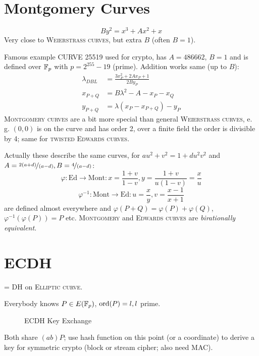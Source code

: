 \section{Montgomery Curves}

\[
By^2 = x^3 + Ax^2 + x
\]
Very close to \textsc{Weierstrass curves}, but extra $B$ (often $B = 1$).

Famous example \textsc{CURVE 25519} used for crypto, has $A=486662$, $B=1$ and is defined over $\mathbb{F}_p$ with $p=2^{255} - 19$ (prime). Addition works same (up to $B$):
\begin{align*}
\lambda_{DBL} &= \frac{3x_P^2 + 2 A x_P + 1}{2 B y_P} \\
x_{P+Q} &= B \lambda^2 - A -x_P - x_Q\\
y_{P+Q} &= \lambda(x_P - x_{P+Q}) - y_P
\end{align*}
\textsc{Montgomery curves} are a bit more special than general \textsc{Weierstrass curves}, e.\,g. $(0,0)$ is on the curve and has order 2, over  a finite field the order is divisible by 4; same for \textsc{twisted Edwards curves}.

Actually these describe the same curves, for $a u^2 +v^2 = 1 +d u^2 v^2$ and $A=\nicefrac{2(a+d)}{(a-d)}, B= \nicefrac{4}{(a-d)}$:
\[
\varphi: \text{Ed} \rightarrow \text{Mont}: x= \frac{1+v}{1-v}, y= \frac{1+v}{u(1-v)} = \frac{x}{u}
\]
\[
\varphi^{-1}: \text{Mont} \rightarrow \text{Ed}: u= \frac{x}{y}, v= \frac{x-1}{x+1}
\]
are defined almost everywhere and $\varphi(P+Q) = \varphi(P) + \varphi(Q)$, $\varphi^{-1} \left(\varphi(P)\right) = P$ etc. \textsc{Montgomery} and \textsc{Edwards curves} are \emph{birationally equivalent}.

\section{ECDH}

= \textsc{DH} on \textsc{Elliptic curve}.

Everybody knows $P \in E(\mathbb{F}_p)$, $\operatorname{ord}(P)=l, l$ prime.

\begin{figure}[H]
  \caption{\textsc{ECDH} Key Exchange}
  \label{fig:ECDH}
\end{figure}

Both share $(ab)P$; use hash function on this point (or a coordinate) to derive a key for symmetric crypto (block or stream cipher; also need \textsc{MAC}).

